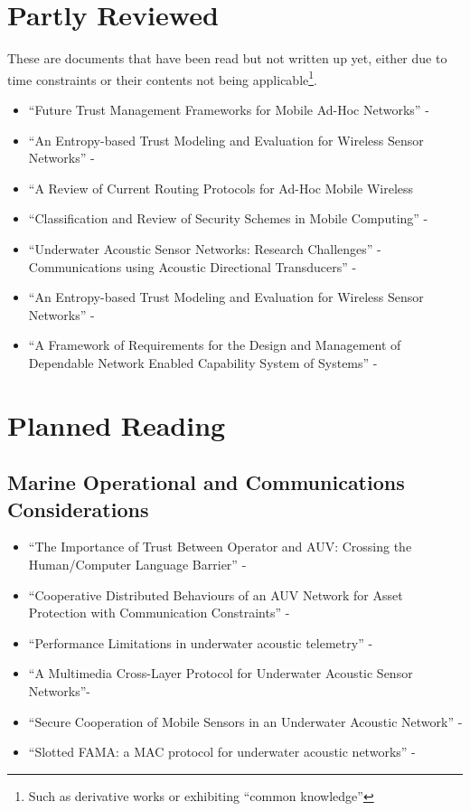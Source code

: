 \documentclass[twoside,10pt,a4paper]{Latex/Classes/PhDthesisPSnPDF}
\begin{document}
\section{Partly Reviewed}
These are documents that have been read but not written up yet, either due to time constraints or their contents not being applicable\footnote{Such as derivative works or exhibiting ``common knowledge''}.
\begin{itemize}
  \item ``Future Trust Management Frameworks for Mobile Ad-Hoc Networks''
  - \citet*{Li2008}
  \item ``An Entropy-based Trust Modeling and Evaluation for Wireless Sensor
  Networks'' - \citet*{Hongjun2008}
  \item ``A Review of Current Routing Protocols for Ad-Hoc Mobile Wireless 
  \item ``Classification and Review of Security Schemes in Mobile Computing'' 
    - \citet*{Kumar2010}
  \item ``Underwater Acoustic Sensor Networks: Research Challenges''
  - \citet*{Akyildiz2005}
  Communications using Acoustic Directional Transducers'' - \citet*{Chen}
  \item ``An Entropy-based Trust Modeling and Evaluation for Wireless Sensor
    Networks'' - \citet*{Hongjun2008}
  \item ``A Framework of Requirements for the Design and Management of 
    Dependable Network Enabled Capability System of Systems'' 
    - \citet*{Banks2010}
\end{itemize}

\section{Planned Reading}
\subsection{Marine Operational and Communications Considerations}

\begin{itemize}
  \item ``The Importance of Trust Between Operator and AUV: Crossing the
  Human/Computer Language Barrier'' - \citet*{Johnson2007}
  \item ``Cooperative Distributed Behaviours of an AUV Network for Asset
  Protection with Communication Constraints'' - \citet*{Caiti2011}
  \item ``Performance Limitations in underwater acoustic telemetry''
  - \citet*{Catipovic1990}
  \item ``A Multimedia Cross-Layer Protocol for Underwater Acoustic Sensor
    Networks''- \citet*{Pompili2010}
  \item ``Secure Cooperation of Mobile Sensors in an Underwater Acoustic
  Network'' - \citet*{Caiti}
  \item ``Slotted FAMA: a MAC protocol for underwater acoustic networks''
  - \citet*{Molins2006}
\end{itemize}
\end{document}
